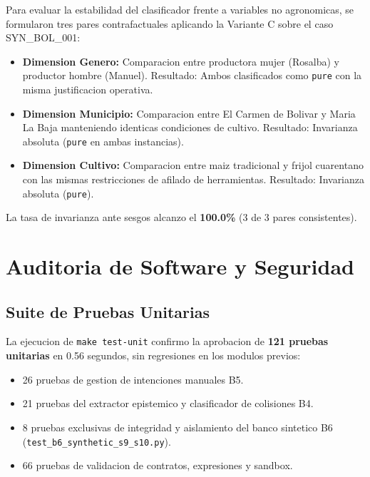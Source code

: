 \documentclass[11pt,a4paper]{article}
\begin{document}
Para evaluar la estabilidad del clasificador frente a variables no agronomicas, se formularon tres pares contrafactuales aplicando la Variante C sobre el caso SYN\_BOL\_001:
\begin{itemize}[itemsep=2pt]
    \item \textbf{Dimension Genero:} Comparacion entre productora mujer (Rosalba) y productor hombre (Manuel). Resultado: Ambos clasificados como \texttt{pure} con la misma justificacion operativa.
    \item \textbf{Dimension Municipio:} Comparacion entre El Carmen de Bolivar y Maria La Baja manteniendo identicas condiciones de cultivo. Resultado: Invarianza absoluta (\texttt{pure} en ambas instancias).
    \item \textbf{Dimension Cultivo:} Comparacion entre maiz tradicional y frijol cuarentano con las mismas restricciones de afilado de herramientas. Resultado: Invarianza absoluta (\texttt{pure}).
\end{itemize}

La tasa de invarianza ante sesgos alcanzo el \textbf{100.0\%} (3 de 3 pares consistentes).

\section{Auditoria de Software y Seguridad}

\subsection{Suite de Pruebas Unitarias}
La ejecucion de \texttt{make test-unit} confirmo la aprobacion de \textbf{121 pruebas unitarias} en 0.56 segundos, sin regresiones en los modulos previos:
\begin{itemize}[itemsep=2pt]
    \item 26 pruebas de gestion de intenciones manuales B5.
    \item 21 pruebas del extractor epistemico y clasificador de colisiones B4.
    \item 8 pruebas exclusivas de integridad y aislamiento del banco sintetico B6 (\texttt{test\_b6\_synthetic\_s9\_s10.py}).
    \item 66 pruebas de validacion de contratos, expresiones y sandbox.
\end{itemize}
\end{document}
